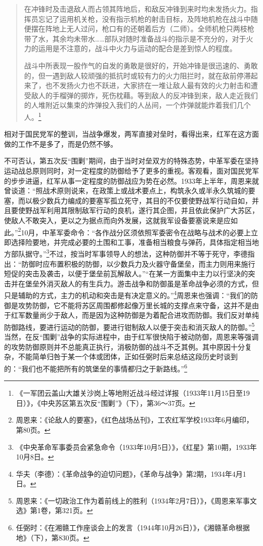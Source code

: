 \begin{quote}

在冲锋时及击退敌人而占领其阵地后，和敌反冲锋到来时均未发扬火力。指挥员忘记了运用机关枪，没有指示机枪的射击目标，及阵地机枪在战斗中随便摆在阵地上无人过问，枪口有的还朝着后方（二师）。全师机枪只两枝枪带了水，其余均未带水……部队对随时准备战斗的指示是不充分的，对于火力的运用是不注意的，战斗中火力与运动的配合是差到惊人的程度。

战斗中所表现一股作气的自发的勇敢是很好的，开始冲锋是很迅速的、勇敢的，但一遇到敌人较顽强的抵抗时或较有力的火力阻拦时，就在敌前停滞起来了，也不发扬火力也不跃进，大家挤在一堆让敌人最有效的火力射击和遭受敌人的手榴弹的掷炸，死伤枕藉。等到敌人的反冲锋到来，敌人走近我们的人堆附近以集束的炸弹投入我们的人丛间，一个炸弹就能炸着我们几个人。\footnote{《一军团云盖山大雄关沙岗上等地附近战斗经过详报（1933年11月15日至19日）》，《中央苏区第五次反“围剿”》（下），第36～37页。}
\end{quote}


相对于国民党军的整训，当战争爆发，两军直接对垒时，看得出来，红军在这方面做的工作不是多了，而是仍然不够。


不可否认，第五次反“围剿”期间，由于当时对垒双方的特殊态势，中革军委在坚持运动战总原则同时，对一定程度的防御给予了更多的重视。客观看，面对国民党军的步步进逼，红军从事一定程度的防御战应为势在必然。1933年上半年，周恩来就曾谈道：“照战术原则说来，在政策上或战术要点上，构筑永久或半永久筑城的要塞，而以极少数兵力编成的要塞军孤立死守，其目的不仅要使野战军行动自如，并且要使野战军利用其限制敌军行动的良机，遂行其企图，并且依此保护广大苏区，使敌人不敢突入，更以之为据点而向外发展，这就我军设备要塞说来是应如此。”\footnote{周恩来：《论敌人的要塞》，《红色战场丛刊》，工农红军学校1933年6月编印，第80页。}10月，中革军委命令：“各作战分区须依照军委密令在战略与战术的必要上立即选择险要地，并完成必要的土围和工事，准备相当粮食与弹药，具体指定相当地方部队据守。”\footnote{《中央革命军事委员会紧急命令（1933年10月5日）》，《红星》第10期，1933年10月8日。}不过，按当时军事领导人的想法，这种防御并不等于死守，李德指出：“防御时应布置积极的防御，以少数兵力及火器守备堡垒，而主力则用来施行短促的突击及袭击，以便于堡垒前瓦解敌人。”“在某一方面集中主力以行坚决的突击并在堡垒外消灭敌人的有生兵力。游击战争和防御虽是革命战争必须的方式，但只是辅助的方式，主力的机动和突击是有决定意义的。”\footnote{华夫（李德）：《革命战争的迫切问题》，《革命与战争》第2期，1934年4月1日。}周恩来也强调：“我们的防御是攻势防御，它不能将苏区周围都修起像万里长城的支撑点来守备，这并不是由于红军数量尚少于敌人，而是因为这种防御是为着配合进攻而防御。我们反对单纯防御路线，要进行运动的防御，要进行钳制敌人以便于突击和消灭敌人的防御。”\footnote{周恩来：《一切政治工作为着前线上的胜利（1934年2月7日）》，《周恩来军事文选》第1卷，第321页。}当然，在反“围剿”战争的实际进程中，由于红军很快陷于被动防御，周恩来等强调的攻势防御原则并不总能真正执行，消极防御的战斗不乏其例。其中原因十分复杂，不能简单归咎于某一个体或团体，正如任弼时后来总结这段历史时谈到的：“我们也不能把所有的筑堡垒的事情都归之于新路线。”\footnote{任弼时：《在湘赣工作座谈会上的发言（1944年10月26日）》，《湘赣革命根据地》（下），第830页。}


